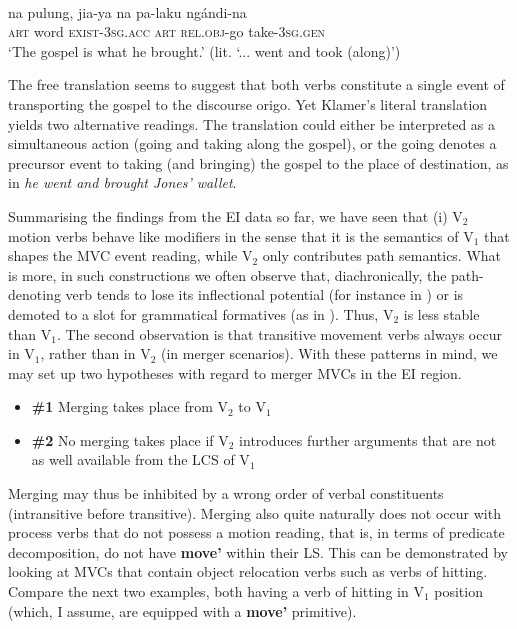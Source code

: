 \ea
{}\\
\gll na pulung, jia-ya na pa-laku ngándi-na \\
\textsc{art} word \textsc{exist}-3\textsc{sg}.\textsc{acc} \textsc{art} \textsc{rel}.\textsc{obj}-go take-3\textsc{sg}.\textsc{gen} \\
\glft `The gospel is what he brought.' (lit. `... went and took (along)') \\
\z

The free translation seems to suggest that both verbs constitute a single event of transporting the gospel to the discourse origo. Yet Klamer's literal translation yields two alternative readings. The translation could either be interpreted as a simultaneous action (going and taking along the gospel), or the going denotes a precursor event to taking (and bringing) the gospel to the place of destination, as in  \textit{he went and brought Jones' wallet}.

Summarising the findings from the EI data so far, we have seen that (i) V$_2$ motion verbs behave like modifiers in the sense that it is the semantics of V$_1$ that shapes the MVC event reading, while V$_2$ only contributes path semantics. What is more, in such constructions we often observe that, diachronically, the path-denoting verb tends to lose its inflectional potential (for instance in ) or is demoted to a slot for grammatical formatives (as in ). Thus, V$_2$ is less stable than V$_1$. The second observation is that transitive movement verbs always occur in V$_1$, rather than in V$_2$ (in merger scenarios). With these patterns in mind, we may set up two hypotheses with regard to merger MVCs in the EI region.

\begin{itemize}
\item \textbf{\#1} Merging takes place from V$_2$ to V$_1$
\item \textbf{\#2} No merging takes place if V$_2$ introduces further arguments that are not as well available from the LCS of V$_1$
\end{itemize}

Merging may thus be inhibited by a wrong order of verbal constituents (intransitive before transitive). Merging also quite naturally does not occur with process verbs that do not possess a motion reading, that is, in terms of predicate decomposition, do not have \textbf{move'} within their LS. This can be demonstrated by looking at MVCs that contain object relocation verbs such as verbs of hitting. Compare the next two examples, both having a verb of hitting in V$_1$ position (which, I assume, are equipped with a \textbf{move'} primitive).

